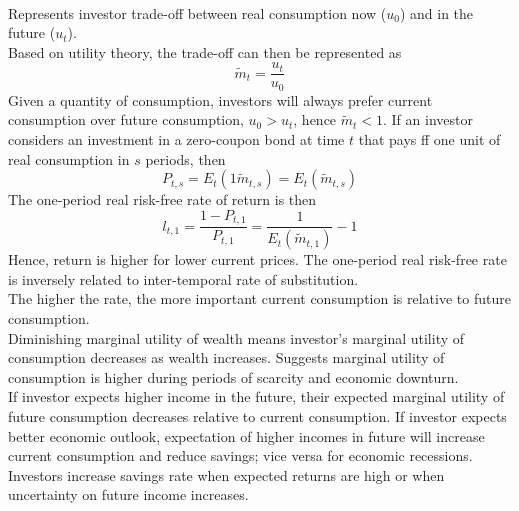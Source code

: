 \begin{remark} \\
Represents investor trade-off between real consumption now ($u_0$) and in the future ($u_t$).\\
Based on utility theory, the trade-off can then be represented as
\begin{equation}
\widetilde{m}_t = \frac{u_t}{u_0} \nonumber
\end{equation}
Given a quantity of consumption, investors will always prefer current consumption over future consumption, $u_0 > u_t$, hence $\widetilde{m}_t < 1$. If an investor considers an investment in a zero-coupon bond at time $t$ that pays ff one unit of real consumption in $s$ periods, then
\begin{equation}
P_{t,s} = E_t(1 \widetilde{m}_{t,s}) = E_t (\widetilde{m}_{t,s}) \nonumber
\end{equation}
The one-period real risk-free rate of return is then
\begin{equation}
l_{t,1} = \frac{1-P_{t,1}}{P_{t,1}} = \frac{1}{E_t (\widetilde{m}_{t,1})} - 1 \nonumber
\end{equation}
Hence, return is higher for lower current prices. The one-period real risk-free rate is inversely related to inter-temporal rate of substitution.\\
The higher the rate, the more important current consumption is relative to future consumption.\\
Diminishing marginal utility of wealth means investor's marginal utility of consumption decreases as wealth increases. Suggests marginal utility of consumption is higher during periods of scarcity and economic downturn.\\
If investor expects higher income in the future, their expected marginal utility of future consumption decreases relative to current consumption. If investor expects better economic outlook, expectation of higher incomes in future will increase current consumption and reduce savings; vice versa for economic recessions.\\
Investors increase savings rate when expected returns are high or when uncertainty on future income increases.
\end{remark}


